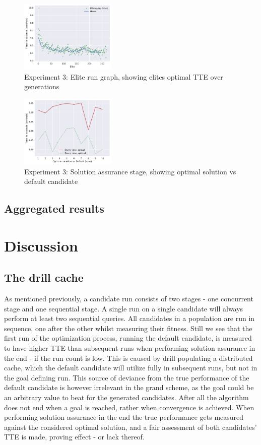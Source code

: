 \documentclass[a4paper,english]{report}
\begin{document}
	\begin{figure}[H]
		\centering
		\includegraphics[width=130pt]{runlogs/final4/3}
		\caption{Experiment 3: Elite run graph, showing elites optimal TTE over generations}
		\label{fig:final33}
	\end{figure}
	\begin{figure}[H]
		\centering
		\includegraphics[width=130pt]{runlogs/final4/4}
		\caption{Experiment 3: Solution assurance stage, showing optimal solution vs default candidate}
		\label{fig:final34}
	\end{figure}
	\clearpage
	\section{Aggregated results}
	\chapter{Discussion}
	\section{The drill cache}
	\label{sec:cache}
		As mentioned previously, a candidate run consists of two stages - one concurrent stage and one sequential stage. A single run on a single candidate will always perform at least two sequential queries. All candidates in a population are run in sequence, one after the other whilst measuring their fitness. Still we see that the first run of the optimization process, running the default candidate, is measured to have higher TTE than subsequent runs when performing solution assurance in the end - if the run count is low. This is caused by drill populating a distributed cache, which the default candidate will utilize fully in subsequent runs, but not in the goal defining run. This source of deviance from the true performance of the default candidate is however irrelevant in the grand scheme, as the goal could be an arbitrary value to beat for the generated candidates. After all the algorithm does not end when a goal is reached, rather when convergence is achieved. When performing solution assurance in the end the true performance gets measured against the considered optimal solution, and a fair assessment of both candidates' TTE is made, proving effect - or lack thereof.
\end{document}
